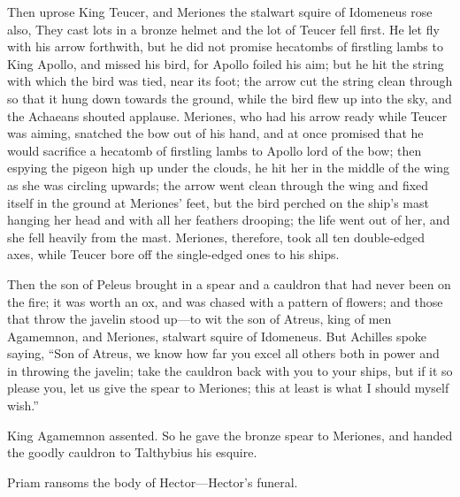 Then uprose King Teucer, and Meriones the stalwart squire of Idomeneus
rose also, They cast lots in a bronze helmet and the lot of Teucer fell
first. He let fly with his arrow forthwith, but he did not promise
hecatombs of firstling lambs to King Apollo, and missed his bird, for
Apollo foiled his aim; but he hit the string with which the bird was tied,
near its foot; the arrow cut the string clean through so that it hung down
towards the ground, while the bird flew up into the sky, and the Achaeans
shouted applause. Meriones, who had his arrow ready while Teucer was
aiming, snatched the bow out of his hand, and at once promised that he
would sacrifice a hecatomb of firstling lambs to Apollo lord of the bow;
then espying the pigeon high up under the clouds, he hit her in the middle
of the wing as she was circling upwards; the arrow went clean through the
wing and fixed itself in the ground at Meriones’ feet, but the bird
perched on the ship’s mast hanging her head and with all her feathers
drooping; the life went out of her, and she fell heavily from the mast.
Meriones, therefore, took all ten double-edged axes, while Teucer bore off
the single-edged ones to his ships.

Then the son of Peleus brought in a spear and a cauldron that had never
been on the fire; it was worth an ox, and was chased with a pattern of
flowers; and those that throw the javelin stood up—to wit the son of
Atreus, king of men Agamemnon, and Meriones, stalwart squire of Idomeneus.
But Achilles spoke saying, “Son of Atreus, we know how far you excel all
others both in power and in throwing the javelin; take the cauldron back
with you to your ships, but if it so please you, let us give the spear to
Meriones; this at least is what I should myself wish.”

King Agamemnon assented. So he gave the bronze spear to Meriones, and
handed the goodly cauldron to Talthybius his esquire.


Priam ransoms the body of Hector—Hector’s funeral.

